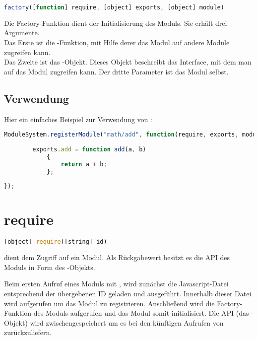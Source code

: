 \begin{lstlisting}[language=JavaScript]
factory([function] require, [object] exports, [object] module)
\end{lstlisting}

Die Factory-Funktion dient der Initialisierung des Moduls. Sie erhält drei Argumente. \\
Das Erste ist die -Funktion, mit Hilfe derer das Modul auf andere Module zugreifen kann. \\
Das Zweite ist das -Objekt. Dieses Objekt beschreibt das Interface, mit dem man auf das Modul zugreifen kann.
Der dritte Parameter ist das Modul selbst.

\subsection{Verwendung}

Hier ein einfaches Beispiel zur Verwendung von :

\begin{lstlisting}[language=JavaScript, caption=Verwendung von registerModule]
ModuleSystem.registerModule("math/add", function(require, exports, module){
	
		exports.add = function add(a, b)
			{
				return a + b;
			};
		
});
\end{lstlisting}

\section{require}

\begin{lstlisting}[language=JavaScript]
[object] require([string] id)
\end{lstlisting}

 dient dem Zugriff auf ein Modul. Als Rückgabewert besitzt es die API des Moduls in Form des -Objekts.

Beim ersten Aufruf eines Moduls mit , wird zunächst die Javascript-Datei entsprechend der übergebenen ID geladen und ausgeführt. Innerhalb dieser Datei wird  aufgerufen um das Modul zu registrieren. Anschließend wird die Factory-Funktion des Moduls aufgerufen und das Modul somit initialisiert. Die API (das -Objekt) wird zwischengespeichert um es bei den künftigen Aufrufen von  zurückzuliefern.

